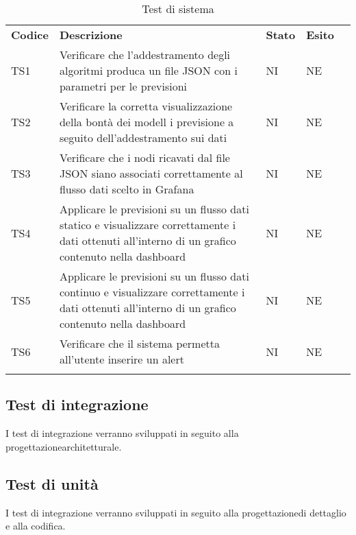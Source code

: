 \begin{longtable} {
		>{}p{15mm} 
		>{}p{79.5mm}
		>{}p{15mm} 
		>{}p{15mm}
		>{}p{0mm}}
	\rowcolor{gray!50}
	\textbf{Codice} & \textbf{Descrizione} & \textbf{Stato} & \textbf{Esito} &\TBstrut \\
	TS1 & Verificare che l'addestramento degli algoritmi produca un file JSON con i parametri per le previsioni & NI & NE  &\TBstrut \\ [2mm]
	TS2 & Verificare la corretta visualizzazione della bontà dei modell	i previsione a seguito dell'addestramento sui dati & NI & NE  &\TBstrut \\ [2mm]
	TS3 & Verificare che i nodi ricavati dal file JSON siano associati correttamente al flusso dati scelto in Grafana\glo & NI & NE  &\TBstrut \\ [2mm]
	TS4 & Applicare le previsioni su un flusso dati statico e visualizzare correttamente i dati ottenuti all'interno di un grafico contenuto nella dashboard\glo & NI & NE  &\TBstrut \\ [2mm]
	TS5 & Applicare le previsioni su un flusso dati continuo e visualizzare correttamente i dati ottenuti all'interno di un grafico contenuto nella dashboard\glo & NI & NE  &\TBstrut \\ [2mm]
	TS6 & Verificare che il sistema permetta all'utente inserire un alert\glo & NI & NE  &\TBstrut \\ [2mm]
	\rowcolor{white}
	\caption{Test di sistema}
\end{longtable}


\subsection{Test di integrazione}
I test di integrazione verranno sviluppati in seguito alla progettazione\glosp architetturale.

\subsection{Test di unità}
I test di integrazione verranno sviluppati in seguito alla progettazione\glosp di dettaglio e alla codifica.

